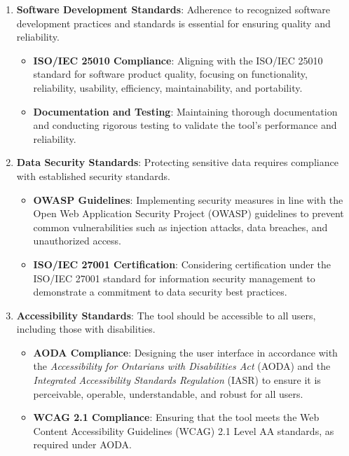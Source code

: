 \documentclass[12pt]{article}
\begin{document}
\begin{enumerate}
    \item \textbf{Software Development Standards}: Adherence to recognized software
    development practices and standards is essential for ensuring quality and reliability.
    \begin{itemize}
        \item \textbf{ISO/IEC 25010 Compliance}: Aligning with the ISO/IEC 25010 standard
        for software product quality, focusing on functionality, reliability, usability,
        efficiency, maintainability, and portability.
        \item \textbf{Documentation and Testing}: Maintaining thorough documentation and
        conducting rigorous testing to validate the tool's performance and reliability.
    \end{itemize}

    \item \textbf{Data Security Standards}: Protecting sensitive data requires compliance
    with established security standards.
    \begin{itemize}
        \item \textbf{OWASP Guidelines}: Implementing security measures in line with the
        Open Web Application Security Project (OWASP) guidelines to prevent common
        vulnerabilities such as injection attacks, data breaches, and unauthorized access.
        \item \textbf{ISO/IEC 27001 Certification}: Considering certification under the
        ISO/IEC 27001 standard for information security management to demonstrate a
        commitment to data security best practices.
    \end{itemize}

    \item \textbf{Accessibility Standards}: The tool should be accessible to all users,
    including those with disabilities.
    \begin{itemize}
        \item \textbf{AODA Compliance}: Designing the user interface in accordance
        with the \textit{Accessibility for Ontarians with Disabilities Act} (AODA) and the 
        \textit{Integrated Accessibility Standards Regulation} (IASR) to ensure it is
        perceivable, operable, understandable, and robust for all users.
        \item \textbf{WCAG 2.1 Compliance}: Ensuring that the tool meets the Web Content 
        Accessibility Guidelines (WCAG) 2.1 Level AA standards, as required under AODA.
    \end{itemize}


\end{enumerate}
\end{document}
